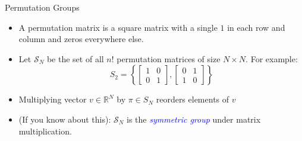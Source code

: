 \documentclass[aspectratio=169,10pt]{beamer}
\newcommand{\R}{\ensuremath{\mathbb{R}}}
\begin{document}
		
\begin{frame}[label = permutationgroup]{Permutation Groups}
	
	\begin{itemize}
		
		\item A permutation matrix is a square matrix with a single $1$ in each row and column and zeros everywhere else.\vspace{0.1in}
		
			
			
		\item Let $\mathcal{S}_N$ be the set of all $n!$ permutation matrices of size $N \times N$. For example:
		\begin{equation*}
			S_2 = \left\{ \begin{bmatrix}1 & 0 \\ 0 & 1\end{bmatrix},  \begin{bmatrix}0 & 1 \\ 1 & 0\end{bmatrix}\right\}
		\end{equation*}
		\item Multiplying vector $v \in \R^N$ by $\pi \in S_N$ reorders elements of $v$\vspace{0.1in}
		
		
		\item (If you know about this): $\mathcal{S}_N$ is the \textcolor{blue}{\textit{symmetric group}} under matrix multiplication.\vspace{0.1in}
	\end{itemize}
\end{frame}
\end{document}
